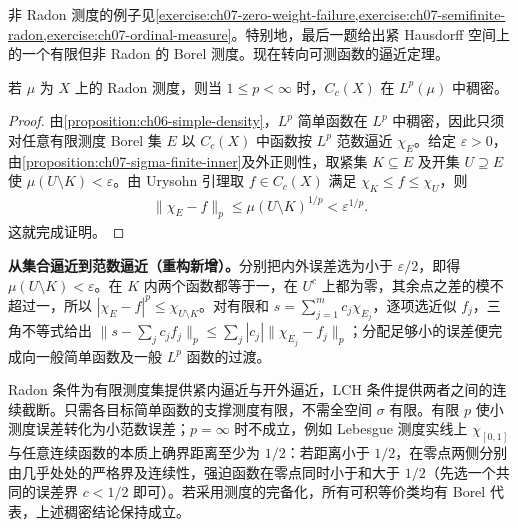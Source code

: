 \documentclass[../../main.tex]{subfiles}
\begin{document}
非 Radon 测度的例子见\cref{exercise:ch07-zero-weight-failure,exercise:ch07-semifinite-radon,exercise:ch07-ordinal-measure}。特别地，最后一题给出紧 Hausdorff 空间上的一个有限但非 Radon 的 Borel 测度。现在转向可测函数的逼近定理。

\begin{proposition}\label{proposition:ch07-cc-lp-density}
若 $\mu$ 为 $X$ 上的 Radon 测度，则当 $1\leqslant p<\infty$ 时，$C_c(X)$ 在 $L^p(\mu)$ 中稠密。
\end{proposition}
\begin{proof}
由\cref{proposition:ch06-simple-density}，$L^p$ 简单函数在 $L^p$ 中稠密，因此只须对任意有限测度 Borel 集 $E$ 以 $C_c(X)$ 中函数按 $L^p$ 范数逼近 $\chi_E$。给定 $\varepsilon>0$，由\cref{proposition:ch07-sigma-finite-inner}及外正则性，取紧集 $K\subseteq E$ 及开集 $U\supseteq E$ 使 $\mu(U\setminus K)<\varepsilon$。由 Urysohn 引理取 $f\in C_c(X)$ 满足 $\chi_K\leqslant f\leqslant\chi_U$，则
\begin{align*}
\|\chi_E-f\|_p\leqslant\mu(U\setminus K)^{1/p}<\varepsilon^{1/p}.
\end{align*}
这就完成证明。
\end{proof}
\begin{remark}
\textbf{从集合逼近到范数逼近（重构新增）。}分别把内外误差选为小于 $\varepsilon/2$，即得 $\mu(U\setminus K)<\varepsilon$。在 $K$ 内两个函数都等于一，在 $U^c$ 上都为零，其余点之差的模不超过一，所以 $|\chi_E-f|^p\leqslant\chi_{U\setminus K}$。对有限和 $s=\sum_{j=1}^m c_j\chi_{E_j}$，逐项选近似 $f_j$，三角不等式给出 $\|s-\sum_j c_jf_j\|_p\leqslant\sum_j|c_j|\|\chi_{E_j}-f_j\|_p$；分配足够小的误差便完成向一般简单函数及一般 $L^p$ 函数的过渡。

Radon 条件为有限测度集提供紧内逼近与开外逼近，LCH 条件提供两者之间的连续截断。只需各目标简单函数的支撑测度有限，不需全空间 $\sigma$ 有限。有限 $p$ 使小测度误差转化为小范数误差；$p=\infty$ 时不成立，例如 Lebesgue 测度实线上 $\chi_{[0,1]}$ 与任意连续函数的本质上确界距离至少为 $1/2$：若距离小于 $1/2$，在零点两侧分别由几乎处处的严格界及连续性，强迫函数在零点同时小于和大于 $1/2$（先选一个共同的误差界 $c<1/2$ 即可）。若采用测度的完备化，所有可积等价类均有 Borel 代表，上述稠密结论保持成立。
\end{remark}
\end{document}
